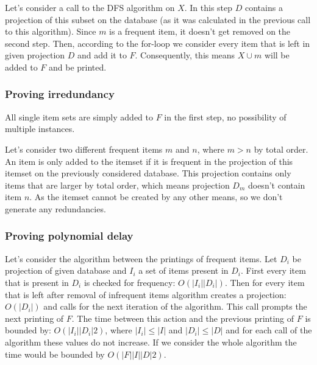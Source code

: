 \documentclass{article}
\begin{document}
  Let's consider a call to the DFS algorithm on $X$.
  In this step $D$ contains a projection of this subset on the database (as it was calculated in the previous call to this algorithm).
  Since $m$ is a frequent item, it doesn't get removed on the second step.
  Then, according to the for-loop we consider every item that is left in given projection $D$ and add it to $F$.
  Consequently, this means $X \cup m$ will be added to $F$ and be printed.

  \subsubsection*{Proving irredundancy}
  All single item sets are simply added to $F$ in the first step, no possibility of multiple instances.

  Let's consider two different frequent items $m$ and $n$, where $m > n$ by total order.
  An item is only added to the itemset if it is frequent in the projection of this itemset on the previously considered database.
  This projection contains only items that are larger by total order, which means projection $D_m$ doesn't contain item $n$.
  As the itemset cannot be created by any other means, so we don't generate any redundancies.

  \subsubsection*{Proving polynomial delay}
  Let's consider the algorithm between the printings of frequent items.
  Let $D_i$ be projection of given database and $I_i$ a set of items present in $D_i$.
  First every item that is present in $D_i$ is checked for frequency: $O(|I_i||D_i|)$.
  Then for every item that is left after removal of infrequent items algorithm creates a projection:
  $O(|D_i|)$ and calls for the next iteration of the algorithm.
  This call prompts the next printing of $F$.
  The time between this action and the previous printing of $F$ is bounded by:
  $O(|I_i||D_i|2)$, where $|I_i| \leq |I|$ and $|D_i| \leq |D|$ and for each call of the algorithm these values do not increase.
  If we consider the whole algorithm the time would be bounded by $O(|F||I||D|2)$.
\end{document}
